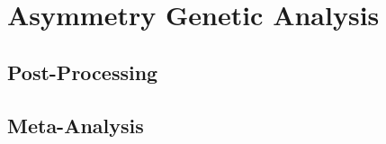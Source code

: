 \chapter{Asymmetry Genetic Analysis}\label{chap:gwas}
\section{Post-Processing}\label{sec:postprocessing}
\section{Meta-Analysis}\label{sec:metaanalysis}